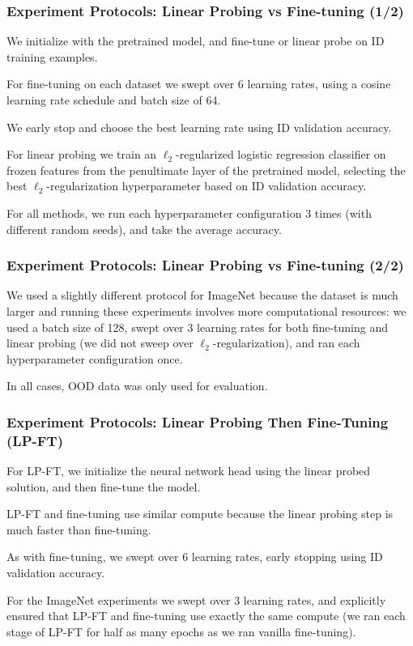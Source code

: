 \documentclass[16pt,aspectratio=169]{beamer}
\begin{document}
\begin{frame}
    \frametitle{Experiment Protocols: Linear Probing vs Fine-tuning (1/2)}

    We initialize with the pretrained model, and fine-tune or linear probe on ID training examples. 
    
    For fine-tuning on each dataset we swept over 6 learning rates, using a cosine learning rate schedule and batch size of 64.
    
    We early stop and choose the best learning rate using ID validation accuracy.
    
    For linear probing we train an $\ell_2$-regularized logistic regression classifier on frozen features from the penultimate layer of the pretrained model, selecting the best $\ell_2$-regularization hyperparameter based on ID validation accuracy. 
    
    For all methods, we run each hyperparameter configuration 3 times (with different random seeds), and take the average accuracy.

\end{frame}

\begin{frame}
    \frametitle{Experiment Protocols: Linear Probing vs Fine-tuning (2/2)}

    We used a slightly different protocol for ImageNet because the dataset is much larger and running these experiments involves more computational resources: we used a batch size of 128, swept over 3 learning rates for both fine-tuning and linear probing (we did not sweep over $\ell_2$-regularization), and ran each hyperparameter configuration once. 
    
    In all cases, OOD data was only used for evaluation.

\end{frame}

\begin{frame}
    \frametitle{Experiment Protocols: Linear Probing Then Fine-Tuning (LP-FT)}

    For LP-FT, we initialize the neural network head using the linear probed solution, and then fine-tune the model. 
    
    LP-FT and fine-tuning use similar compute because the linear probing step is much faster than fine-tuning.
    
    As with fine-tuning, we swept over 6 learning rates, early stopping using ID validation accuracy.
    
    For the ImageNet experiments we swept over 3 learning rates, and explicitly ensured that LP-FT and fine-tuning use exactly the same compute (we ran each stage of LP-FT for half as many epochs as we ran vanilla fine-tuning).

\end{frame}
\end{document}
